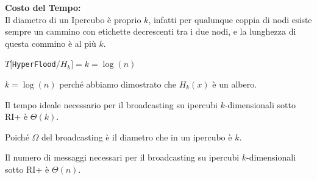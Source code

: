 \textbf{Costo del Tempo:}\\
Il diametro di un Ipercubo è proprio $k$, infatti per qualunque coppia di nodi
esiste sempre un cammino con etichette decrescenti tra i due nodi, e la
lunghezza di questa commino è al più $k$.
\begin{center}
    $T[$\texttt{HyperFlood}$ / H_k] = k = \log(n) $
\end{center}
$k=\log(n)$ perché abbiamo dimostrato che $H_k(x)$ è un albero.


\begin{prop}
    Il tempo ideale necessario per il broadcasting su ipercubi
    $k$-dimensionali sotto RI+ è $\Theta(k)$.
\end{prop}

Poiché $\Omega$ del broadcasting è il diametro che in un ipercubo è $k$.

\begin{prop}
    Il numero di messaggi necessari per il broadcasting su ipercubi
    $k$-dimensionali sotto RI+ è $\Theta(n)$.
\end{prop}